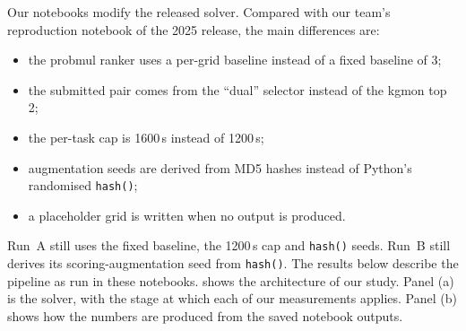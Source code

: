 \documentclass[11pt]{article}
\newcommand{\code}[1]{\texttt{#1}}
\begin{document}
Our notebooks modify the released solver. Compared with our team's reproduction notebook of the 2025 release, the main differences are:
\begin{itemize}
\item the probmul ranker uses a per-grid baseline instead of a fixed baseline of 3;
\item the submitted pair comes from the ``dual'' selector instead of the kgmon top 2;
\item the per-task cap is 1600\,s instead of 1200\,s;
\item augmentation seeds are derived from MD5 hashes instead of Python's randomised \code{hash()};
\item a placeholder grid is written when no output is produced.
\end{itemize}
Run~A still uses the fixed baseline, the 1200\,s cap and \code{hash()} seeds. Run~B still derives its scoring-augmentation seed from \code{hash()}.
The results below describe the pipeline as run in these notebooks.
 shows the architecture of our study. Panel (a) is the solver, with the stage at which each of our measurements applies. Panel (b) shows how the numbers are produced from the saved notebook outputs.
\end{document}
